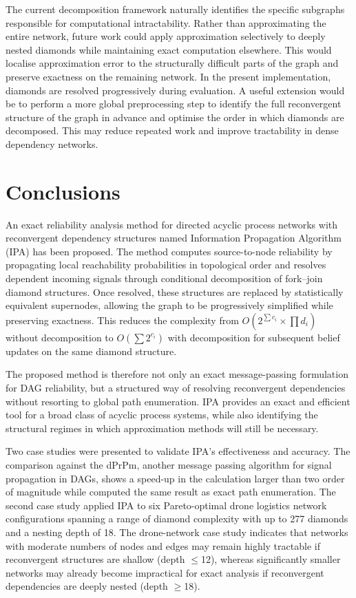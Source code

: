 \documentclass[preprint,12pt]{elsarticle}
\begin{document}
The current decomposition framework naturally identifies the specific subgraphs responsible for computational intractability. Rather than approximating the entire network, future work could apply approximation selectively to deeply nested diamonds while maintaining exact computation elsewhere. This would localise approximation error to the structurally difficult parts of the graph and preserve exactness on the remaining network.
In the present implementation, diamonds are resolved progressively during evaluation. A useful extension would be to perform a more global preprocessing step to identify the full reconvergent structure of the graph in advance and optimise the order in which diamonds are decomposed. This may reduce repeated work and improve tractability in dense dependency networks.

\section{Conclusions}
An exact reliability analysis method for directed acyclic process networks with reconvergent dependency structures named Information Propagation Algorithm (IPA) has been proposed. 
The method computes source-to-node reliability by propagating local reachability probabilities in topological order and resolves dependent incoming signals through conditional decomposition of fork--join diamond structures. Once resolved, these structures are replaced by statistically equivalent supernodes, allowing the graph to be progressively simplified while preserving exactness. This reduces the complexity from $O(2^{\sum c_i} \times \prod d_i)$ without decomposition to $O(\sum 2^{c_i})$ with decomposition for subsequent belief updates on the same diamond structure.

The proposed method is therefore not only an exact message-passing formulation for DAG reliability, but a structured way of resolving reconvergent dependencies without resorting to global path enumeration. IPA provides an exact and efficient tool for a broad class of acyclic process systems, while also identifying the structural regimes in which approximation methods will still be necessary.


Two case studies were presented to validate IPA's effectiveness and accuracy. The comparison against the dPrPm, another message passing algorithm for signal propagation in DAGs, shows a speed-up in the calculation larger than two order of magnitude  while computed the same result as exact path enumeration. 
The second case study applied IPA to six Pareto-optimal drone logistics network configurations spanning a range of diamond complexity with up to 277 diamonds and a nesting depth of 18. The drone-network case study indicates that networks with moderate numbers of nodes and edges may remain highly tractable if reconvergent structures are shallow (depth $\leq$12), whereas significantly smaller networks may already become impractical for exact analysis if reconvergent dependencies are deeply nested (depth $\geq$18).
\end{document}
